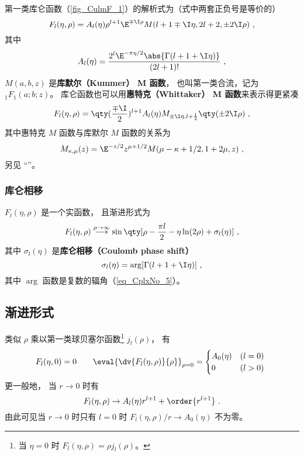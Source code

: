 第一类库仑函数（\autoref{fig_CulmF_1}）的解析式为（式中两套正负号是等价的）
\begin{equation}\label{eq_CulmF_1}
F_l(\eta, \rho) = A_l(\eta) \rho^{l+1} \E^{\mp\I\rho} M(l+1\mp\I\eta, 2l+2, \pm 2\I\rho)~,
\end{equation}
其中
\begin{equation}
A_l(\eta) = \frac{2^l \E^{-\pi\eta/2} \abs{\Gamma(l+1+\I\eta)}}{(2l+1)!}~,
\end{equation}
$M(a, b, z)$ 是\textbf{库默尔（Kummer） M 函数}， 也叫第一类合流，记为 $_1 F_1(a;b;z)$。 库仑函数也可以用\textbf{惠特克（Whittaker） M 函数}来表示得更紧凑
\begin{equation}\label{eq_CulmF_2}
F_l(\eta, \rho) = \qty(\frac{\mp\I}{2})^{l+1} A_l(\eta) M_{\pm\I\eta, l+\frac12}\qty(\pm 2\I\rho)~,
\end{equation}
其中惠特克 $M$ 函数与库默尔 $M$ 函数的关系为
\begin{equation}
M_{\kappa, \mu}(z) = \E^{-z/2} z^{\mu + 1/2} M(\mu - \kappa + 1/2, 1 + 2\mu, z)~,
\end{equation}
另见 “”。

\subsubsection{库仑相移}
$F_l(\eta, \rho)$ 是一个实函数， 且渐进形式为
\begin{equation}\label{eq_CulmF_7} %
F_l(\eta, \rho) \overset{\rho\to \infty}{\longrightarrow} \sin\qty[\rho - \frac{\pi l}{2} - \eta\ln(2\rho) + \sigma_l(\eta)]~,
\end{equation}
其中 $\sigma_l(\eta)$ 是\textbf{库仑相移（Coulomb phase shift）}
\begin{equation}\label{eq_CulmF_8}
\sigma_l(\eta) = \arg[\Gamma(l+1+\I\eta)]~,
\end{equation}
其中 $\arg$ 函数是复数的辐角（\autoref{eq_CplxNo_5}）。

\subsection{渐进形式}
类似 $\rho$ 乘以第一类球贝塞尔函数\footnote{当 $\eta = 0$ 时 $F_l(\eta, \rho)=\rho j_l(\rho)$。} $j_l(\rho)$， 有
\begin{equation}
F_l(\eta, 0) = 0 \qquad \eval{\dv{F_l(\eta, \rho)}{\rho}}_{\rho=0} = 
\begin{cases}
A_0(\eta) &(l = 0)\\
0     &(l > 0)
\end{cases}~
\end{equation}
更一般地， 当 $r\to 0$ 时有
\begin{equation} %
F_l(\eta, \rho) \rightarrow A_l(\eta) r^{l+1} + \order{r^{l+1}}~.
\end{equation}
由此可见当 $r\to 0$ 时只有 $l = 0$ 时 $F_l(\eta, \rho)/r \to A_0(\eta)$ 不为零。

